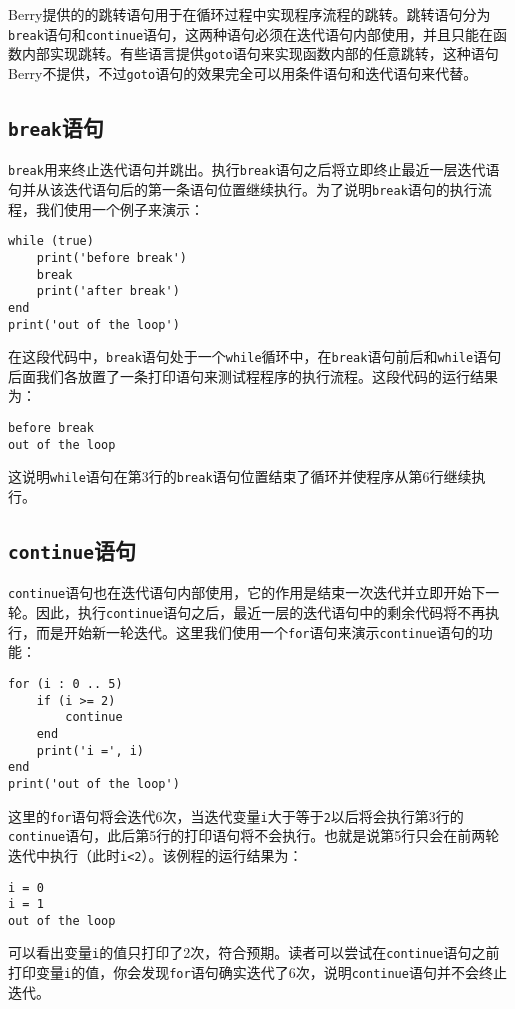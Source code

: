Berry提供的的跳转语句用于在循环过程中实现程序流程的跳转。跳转语句分为\texttt{break}语句和\texttt{continue}语句，这两种语句必须在迭代语句内部使用，并且只能在函数内部实现跳转。有些语言提供\texttt{goto}语句来实现函数内部的任意跳转，这种语句Berry不提供，不过\texttt{goto}语句的效果完全可以用条件语句和迭代语句来代替。

\subsection{\texttt{break}语句}

\texttt{break}用来终止迭代语句并跳出。执行\texttt{break}语句之后将立即终止最近一层迭代语句并从该迭代语句后的第一条语句位置继续执行。为了说明\texttt{break}语句的执行流程，我们使用一个例子来演示：
\begin{lstlisting}[language=berry]
while (true)
    print('before break')
    break
    print('after break')
end
print('out of the loop')
\end{lstlisting}
在这段代码中，\texttt{break}语句处于一个\texttt{while}循环中，在\texttt{break}语句前后和\texttt{while}语句后面我们各放置了一条打印语句来测试程程序的执行流程。这段代码的运行结果为：
\begin{lstlisting}[numbers=none]
before break
out of the loop
\end{lstlisting}
这说明\texttt{while}语句在第3行的\texttt{break}语句位置结束了循环并使程序从第6行继续执行。

\subsection{\texttt{continue}语句}

\texttt{continue}语句也在迭代语句内部使用，它的作用是结束一次迭代并立即开始下一轮。因此，执行\texttt{continue}语句之后，最近一层的迭代语句中的剩余代码将不再执行，而是开始新一轮迭代。这里我们使用一个\texttt{for}语句来演示\texttt{continue}语句的功能：
\begin{lstlisting}[language=berry]
for (i : 0 .. 5)
    if (i >= 2)
        continue
    end
    print('i =', i)
end
print('out of the loop')
\end{lstlisting}
这里的\texttt{for}语句将会迭代6次，当迭代变量\texttt{i}大于等于\texttt{2}以后将会执行第3行的\texttt{continue}语句，此后第5行的打印语句将不会执行。也就是说第5行只会在前两轮迭代中执行（此时\texttt{i<2}）。该例程的运行结果为：
\begin{lstlisting}[numbers=none]
i = 0
i = 1
out of the loop
\end{lstlisting}
可以看出变量\texttt{i}的值只打印了2次，符合预期。读者可以尝试在\texttt{continue}语句之前打印变量\texttt{i}的值，你会发现\texttt{for}语句确实迭代了6次，说明\texttt{continue}语句并不会终止迭代。

